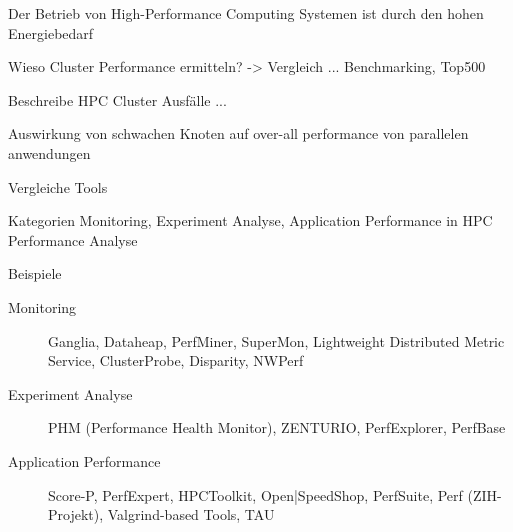 \par Der Betrieb von High-Performance Computing Systemen ist durch den hohen Energiebedarf 

\par Wieso Cluster Performance ermitteln? -> Vergleich ... Benchmarking, Top500


\par 

\par Beschreibe HPC Cluster Ausfälle ...\cite{Schroeder2010}

\par Auswirkung von schwachen Knoten auf over-all performance von parallelen anwendungen

\par Vergleiche Tools \cite{Kufrin2005,Mucci2005,Kerbyson,Sottile2002,Hoffman2005,Prodan2002,Agelastos2014,Liang1999,Desai2008,Kluge2012,Mooney2004,Massie2004,Huck2005,Worringen2005,Quintero2014,Burtscher2010}

\par Kategorien Monitoring, Experiment Analyse, Application Performance in HPC Performance Analyse

\par Beispiele
\begin{description}
\item[Monitoring] Ganglia, Dataheap, PerfMiner, SuperMon, Lightweight Distributed Metric Service, ClusterProbe, Disparity, NWPerf

\item[Experiment Analyse] PHM (Performance Health Monitor), ZENTURIO, PerfExplorer, PerfBase

\item[Application Performance] Score-P, PerfExpert, HPCToolkit, Open|SpeedShop, PerfSuite, Perf (ZIH-Projekt), Valgrind-based Tools, TAU

\end{description}
